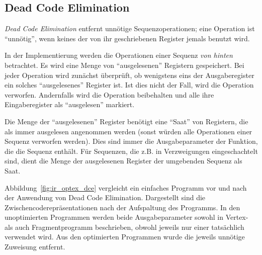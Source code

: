 \documentclass[twoside,a4paper,fleqn,12pt]{book}
\begin{document}

\subsection{Dead Code Elimination}

\emph{Dead Code Elimination} entfernt unnötige Sequenzoperationen; eine Operation ist "`unnötig"',
wenn keines der von ihr geschriebenen Register jemals benutzt wird.


In der Implementierung werden die Operationen einer Sequenz \emph{von hinten} betrachtet.
Es wird eine Menge von "`ausgelesenen"' Registern gespeichert. Bei jeder Operation wird
zunächst überprüft, ob wenigstens eins der Ausgaberegister ein solches "`ausgelesenes"'
Register ist. Ist dies nicht der Fall, wird die Operation verworfen. Andernfalls wird
die Operation beibehalten und alle ihre Eingaberegister als "`ausgelesen"' markiert.

Die Menge der "`ausgelesenen"' Register benötigt eine "`Saat"' von Registern, die als
immer ausgelesen angenommen werden (sonst würden alle Operationen einer Sequenz verworfen
werden). Dies sind immer die Ausgabeparameter der Funktion, die die Sequenz enthält.
Für Sequenzen, die z.B. in Verzweigungen eingeschachtelt sind, dient die Menge der
ausgelesenen Register der umgebenden Sequenz als Saat.


Abbildung~\ref{fig:ir_optex_dce} vergleicht ein einfaches Programm vor und nach der Anwendung von Dead Code Elimination.
Dargestellt sind die Zwischencoderepräsentationen nach der Aufspaltung des Programms.
In den unoptimierten Programmen werden beide Ausgabeparameter sowohl in Vertex- als auch Fragmentprogramm
beschrieben, obwohl jeweils nur einer tatsächlich verwendet wird. Aus den optimierten Programmen wurde die jeweils unnötige
Zuweisung entfernt.

\end{document}
